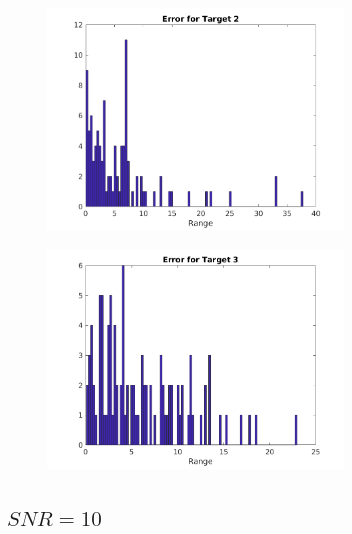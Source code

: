 \documentclass[a4paper,11pt]{article}
\begin{document}
\begin{figure}[!hp]
    \begin{center}
      \includegraphics[width=0.7\textwidth]{images/hist_e2_1.png}
    \end{center}
\end{figure}

\begin{figure}[!hp]
    \begin{center}
      \includegraphics[width=0.7\textwidth]{images/hist_e3_1.png}
    \end{center}
\end{figure}

\newpage

\subsection{$SNR = 10$}
\end{document}

